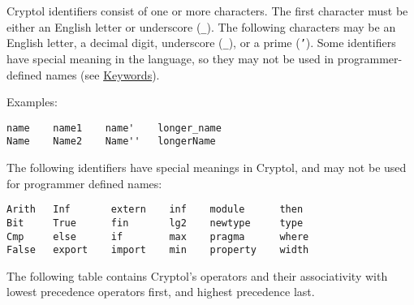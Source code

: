 Cryptol identifiers consist of one or more characters. The first
character must be either an English letter or underscore (\texttt{\_}).
The following characters may be an English letter, a decimal digit,
underscore (\texttt{\_}), or a prime (\texttt{'}). Some identifiers have
special meaning in the language, so they may not be used in
programmer-defined names (see
\hyperref[keywords-and-built-in-operators]{Keywords}).

Examples:

\begin{verbatim}
name    name1    name'    longer_name
Name    Name2    Name''   longerName
\end{verbatim}


The following identifiers have special meanings in Cryptol, and may not
be used for programmer defined names:

\begin{verbatim}
Arith   Inf       extern    inf    module      then     
Bit     True      fin       lg2    newtype     type     
Cmp     else      if        max    pragma      where    
False   export    import    min    property    width    
\end{verbatim}

The following table contains Cryptol's operators and their associativity
with lowest precedence operators first, and highest precedence last.

